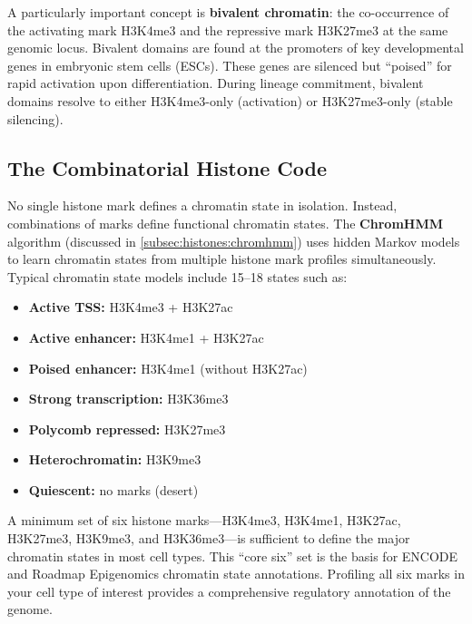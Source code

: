 A particularly important concept is \textbf{bivalent chromatin}: the co-occurrence of the activating mark H3K4me3 and the repressive mark H3K27me3 at the same genomic locus. Bivalent domains are found at the promoters of key developmental genes in embryonic stem cells (ESCs). These genes are silenced but ``poised'' for rapid activation upon differentiation. During lineage commitment, bivalent domains resolve to either H3K4me3-only (activation) or H3K27me3-only (stable silencing).

\subsection{The Combinatorial Histone Code}
\label{subsec:histones:combinatorial}

No single histone mark defines a chromatin state in isolation. Instead, combinations of marks define functional chromatin states. The \textbf{ChromHMM} algorithm (discussed in \cref{subsec:histones:chromhmm}) uses hidden Markov models to learn chromatin states from multiple histone mark profiles simultaneously. Typical chromatin state models include 15--18 states such as:

\begin{itemize}[itemsep=2pt]
  \item \textbf{Active TSS:} H3K4me3 + H3K27ac
  \item \textbf{Active enhancer:} H3K4me1 + H3K27ac
  \item \textbf{Poised enhancer:} H3K4me1 (without H3K27ac)
  \item \textbf{Strong transcription:} H3K36me3
  \item \textbf{Polycomb repressed:} H3K27me3
  \item \textbf{Heterochromatin:} H3K9me3
  \item \textbf{Quiescent:} no marks (desert)
\end{itemize}

\begin{keyconcept}[title={Why Profile Multiple Histone Marks?}]
A minimum set of six histone marks---H3K4me3, H3K4me1, H3K27ac, H3K27me3, H3K9me3, and H3K36me3---is sufficient to define the major chromatin states in most cell types. This ``core six'' set is the basis for ENCODE and Roadmap Epigenomics chromatin state annotations. Profiling all six marks in your cell type of interest provides a comprehensive regulatory annotation of the genome.
\end{keyconcept}

